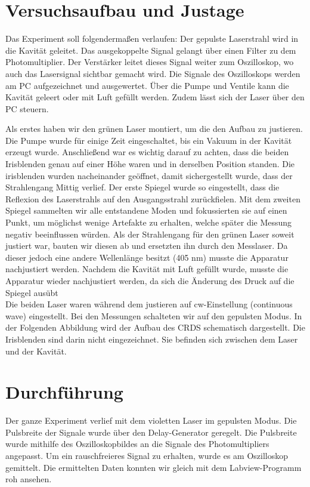 \section{Versuchsaufbau und Justage}

Das Experiment soll folgendermaßen verlaufen: Der gepulste Laserstrahl wird in die Kavität geleitet. Das ausgekoppelte Signal gelangt über einen Filter zu dem Photomultiplier. Der Verstärker leitet dieses Signal weiter zum Oszilloskop, wo auch das Lasersignal sichtbar gemacht wird. Die Signale des Oszilloskops werden am PC aufgezeichnet und ausgewertet. Über die Pumpe und Ventile kann die Kavität geleert oder mit Luft gefüllt werden. Zudem lässt sich der Laser über den PC steuern.

Als erstes haben wir den grünen Laser montiert, um die den Aufbau zu justieren. Die Pumpe wurde für einige Zeit eingeschaltet, bis ein Vakuum in der Kavität erzeugt wurde. Anschließend war es wichtig darauf zu achten, dass die beiden Irisblenden genau auf einer Höhe waren und in derselben Position standen. Die irisblenden wurden nacheinander geöffnet, damit sichergestellt wurde, dass der Strahlengang Mittig verlief. Der erste Spiegel wurde so eingestellt, dass die Reflexion des Laserstrahls auf den Ausgangsstrahl zurückfielen. Mit dem zweiten Spiegel sammelten wir alle entstandene Moden und fokussierten sie auf einen Punkt, um möglichst wenige Artefakte zu erhalten, welche später die Messung negativ beeinflussen würden. Als der Strahlengang für den grünen Laser soweit justiert war, bauten wir diesen ab und ersetzten ihn durch den Messlaser. Da dieser jedoch eine andere Wellenlänge besitzt (405 nm) musste die Apparatur nachjustiert werden. Nachdem die Kavität mit Luft gefüllt wurde, musste die Apparatur wieder nachjustiert werden, da sich die Änderung des Druck auf die Spiegel ausübt\\
Die beiden Laser waren während dem justieren auf cw-Einstellung (continuous wave) eingestellt. Bei den Messungen schalteten wir auf den gepulsten Modus. In der Folgenden Abbildung wird der Aufbau des CRDS schematisch dargestellt. Die Irisblenden sind darin nicht eingezeichnet. Sie befinden sich zwischen dem Laser und der Kavität.


\section{Durchführung}

Der ganze Experiment verlief mit dem violetten Laser im gepulsten Modus. Die Pulsbreite der Signale wurde über den Delay-Generator geregelt. Die Pulsbreite wurde mithilfe des Oszilloskopbildes an die Signale des Photomultipliers angepasst. Um ein rauschfreieres Signal zu erhalten, wurde es am Oszilloskop gemittelt. Die ermittelten Daten konnten wir gleich mit dem Labview-Programm roh ansehen. 

